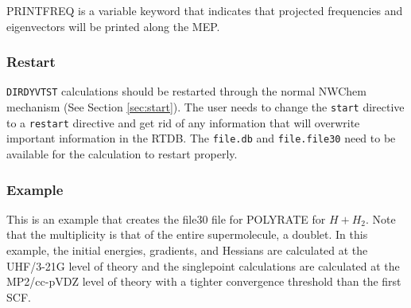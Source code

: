     PRINTFREQ is a variable keyword that indicates that projected
              frequencies and eigenvectors will be printed along the MEP.

\subsubsection{Restart}

\verb+DIRDYVTST+ calculations should be restarted through the normal NWChem
mechanism (See Section \ref{sec:start}).  The user needs to change the
\verb+start+ directive to a \verb+restart+ directive and get rid of any
information that will overwrite important information in the RTDB.  The
\verb+file.db+ and \verb+file.file30+ need to be available for the
calculation to restart properly.

\subsubsection{Example}

This is an example that creates the file30 file for POLYRATE for $H + H_2$.
Note that the multiplicity is that of the entire supermolecule, a doublet.
In this example, the initial energies, gradients, and Hessians are calculated
at the UHF/3-21G level of theory and the singlepoint calculations are 
calculated at the MP2/cc-pVDZ level of theory with a tighter convergence
threshold than the first SCF.

